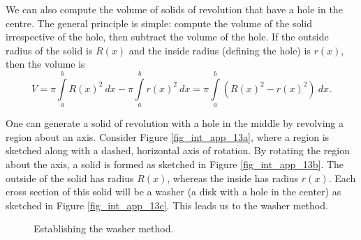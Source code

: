 We can also compute the volume of solids of revolution that have a hole in the centre. The general principle is simple: compute the volume of the solid irrespective of the hole, then subtract the volume of the hole. If the outside radius of the solid is $R(x)$ and the inside radius (defining the hole) is $r(x)$, then the volume is 
$$V = \pi\int\limits_a^b R(x)^2 \ dx - \pi\int\limits_a^b r(x)^2\ dx = \pi\int\limits_a^b \left(R(x)^2-r(x)^2\right)\ dx.$$


One can generate a solid of revolution with a hole in the middle by revolving a region about an axis. Consider Figure \ref{fig_int_app_13a}, where a region is sketched along with a dashed, horizontal axis of rotation. By rotating the region about the axis, a solid is formed as sketched in Figure \ref{fig_int_app_13b}. The outside of the solid has radius $R(x)$, whereas the inside has radius $r(x)$. Each cross section of this solid will be a washer (a disk with a hole in the center) as sketched in Figure \ref{fig_int_app_13c}.	This leads us to the washer method.


\begin{figure}[h]
\centering
\qquad
{}
\qquad
{}
\caption{Establishing the washer method.}
\end{figure}


